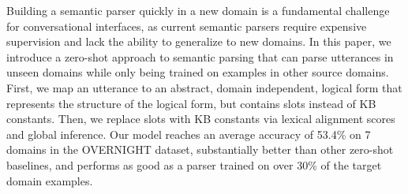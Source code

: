 Building a semantic parser quickly in a new domain is a fundamental challenge for conversational interfaces, as current semantic parsers require expensive supervision and lack the ability to generalize to new domains. In this paper, we introduce a zero-shot approach to semantic parsing that can parse utterances in unseen domains while only being trained on examples in other source domains. First, we map an utterance to an abstract, domain independent, logical form that represents the structure of the logical form, but contains slots instead of KB constants. Then, we replace slots with KB constants via lexical alignment scores and global inference. Our model reaches an average accuracy of 53.4\% on 7 domains in the OVERNIGHT dataset, substantially better than other zero-shot baselines, and performs as good as a parser trained on over 30\% of the target domain examples.
